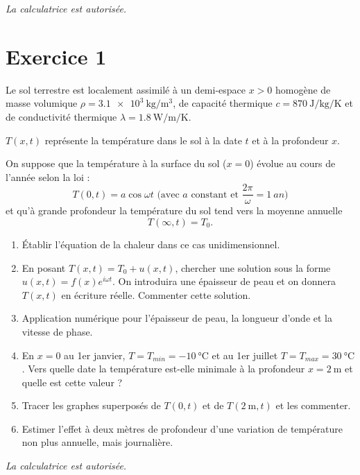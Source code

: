 \documentclass[a4paper,12pt,french]{article}
\begin{document}
	
\begin{center}
	\textit{La calculatrice est autorisée.}
\end{center}

\section{Exercice 1}

Le sol terrestre est localement assimilé à un demi-espace $x>0$ homogène de masse volumique $\rho = \SI{3.1e3}{\kilogram\per\cubic\meter}$, de capacité thermique $c = \SI{870}{\joule\per\kilogram\per\kelvin}$ et de conductivité thermique $\lambda = \SI{1.8}{\watt\per\meter\per\kelvin}$.

$T(x, t)$ représente la température dans le sol à la date $t$ et à la profondeur $x$.

On suppose que la température à la surface du sol ($x=0$) évolue au cours de l'année selon la loi : $$T(0, t) = a \cos \omega t\textrm{ (avec } a \textrm{ constant et } \frac{2\pi}{\omega} = \SI{1}{an}\textrm{)}$$ et qu'à grande profondeur la température du sol tend vers la moyenne annuelle $$T(\infty, t) = T_0.$$

\begin{enumerate}
	\item Établir l'équation de la chaleur dans ce cas unidimensionnel.
	\item En posant $T(x, t) = T_0 + u(x, t)$, chercher une solution sous la forme $u(x, t) = f(x) e^{i\omega t}$. On introduira une épaisseur de peau et on donnera $T(x, t)$ en écriture réelle. Commenter cette solution.
	\item Application numérique pour l'épaisseur de peau, la longueur d'onde et la vitesse de phase.
	\item En $x=0$ au 1er janvier, $T = T_{min} = \SI{-10}{\degreeCelsius}$ et au 1er juillet $T = T_{max} = \SI{30}{\degreeCelsius}$. Vers quelle date la température est-elle minimale à la profondeur $x = \SI{2}{\meter}$ et quelle est cette valeur ?
	\item Tracer les graphes superposés de $T(0, t)$ et de $T(\SI{2}{\meter}, t)$ et les commenter.
	\item Estimer l'effet à deux mètres de profondeur d'une variation de température non plus annuelle, mais journalière.
\end{enumerate}

\newpage

\begin{center}
	\textit{La calculatrice est autorisée.}
\end{center}
\end{document}
